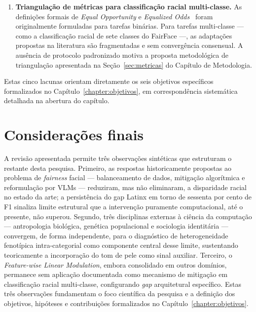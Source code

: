 \begin{enumerate}[label=\textbf{Lacuna \arabic*}.]
\item \textbf{Triangulação de métricas para classificação racial multi-classe.} As definições formais de \emph{Equal Opportunity} e \emph{Equalized Odds}~\cite{hardt2016equality} foram originalmente formuladas para tarefas binárias. Para tarefas multi-classe --- como a classificação racial de sete classes do FairFace ---, as adaptações propostas na literatura são fragmentadas e sem convergência consensual. A ausência de protocolo padronizado motiva a proposta metodológica de triangulação apresentada na Seção~\ref{sec:metricas} do Capítulo de Metodologia.
\end{enumerate}

Estas cinco lacunas orientam diretamente os seis objetivos específicos formalizados no Capítulo~\ref{chapter:objetivos}, em correspondência sistemática detalhada na abertura do capítulo.

\section{Considerações finais}
\label{sec:rl_consideracoes}

A revisão apresentada permite três observações sintéticas que estruturam o restante desta pesquisa. Primeiro, as respostas historicamente propostas ao problema de \emph{fairness} facial --- balanceamento de dados, mitigação algorítmica e reformulação por VLMs --- reduziram, mas não eliminaram, a disparidade racial no estado da arte; a persistência do gap Latinx em torno de sessenta por cento de F1 sinaliza limite estrutural que a intervenção puramente computacional, até o presente, não superou. Segundo, três disciplinas externas à ciência da computação --- antropologia biológica, genética populacional e sociologia identitária --- convergem, de forma independente, para o diagnóstico de heterogeneidade fenotípica intra-categorial como componente central desse limite, sustentando teoricamente a incorporação do tom de pele como sinal auxiliar. Terceiro, o \emph{Feature-wise Linear Modulation}, embora consolidado em outros domínios, permanece sem aplicação documentada como mecanismo de mitigação em classificação racial multi-classe, configurando \emph{gap} arquitetural específico. Estas três observações fundamentam o foco científica da pesquisa e a definição dos objetivos, hipóteses e contribuições formalizados no Capítulo~\ref{chapter:objetivos}.
